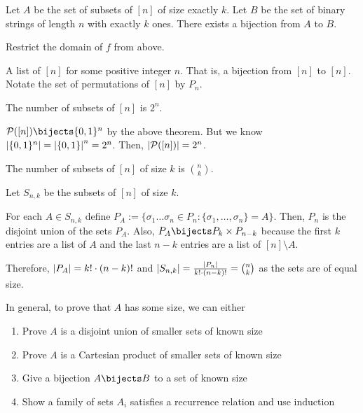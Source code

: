\documentclass[class=math239,notes]{agony}
\begin{document}
\begin{theorem}
  Let $A$ be the set of subsets of $[n]$ of size exactly $k$.
  Let $B$ be the set of binary strings of length $n$ with exactly $k$ ones.
  There exists a bijection from $A$ to $B$.
\end{theorem}
\begin{prf}
  Restrict the domain of $f$ from above.
\end{prf}

\begin{defn}[permutation]
  A list of $[n]$ for some positive integer $n$.
  That is, a bijection from $[n]$ to $[n]$.
  Notate the set of permutations of $[n]$ by $P_n$.
\end{defn}

\begin{theorem}[1.3]
  The number of subsets of $[n]$ is $2^n$.
\end{theorem}
\begin{prf}
  $\mathcal{P}([n]) \bijects \{0,1\}^n$ by the above theorem.
  But we know $\abs{\{0,1\}^n} = \abs{\{0,1\}}^n = 2^n$.
  Then, $\abs{\mathcal{P}([n])} = 2^n$.
\end{prf}

\begin{theorem}[1.5]
  The number of subsets of $[n]$ of size $k$ is $\binom{n}{k}$.
\end{theorem}
\begin{prf}
  Let $S_{n,k}$ be the subsets of $[n]$ of size $k$.

  For each $A \in S_{n,k}$ define $P_A := \{\sigma_1\dots\sigma_n \in P_n : \{\sigma_1,\dotsc,\sigma_n\} = A\}$.
  Then, $P_n$ is the disjoint union of the sets $P_A$.
  Also, $P_A \bijects P_k \times P_{n-k}$ because the first $k$ entries are a list of $A$
  and the last $n-k$ entries are a list of $[n] \setminus A$.

  Therefore, $\abs{P_A} = k! \cdot (n-k)!$ and
  $\abs{S_{n,k}} = \frac{\abs{P_n}}{k!\cdot(n-k)!} = \binom{n}{k}$
  as the sets are of equal size.
\end{prf}

In general, to prove that $A$ has some size, we can either
\begin{enumerate}[(1),nosep]
  \item Prove $A$ is a disjoint union of smaller sets of known size
  \item Prove $A$ is a Cartesian product of smaller sets of known size
  \item Give a bijection $A \bijects B$ to a set of known size
  \item Show a family of sets $A_i$ satisfies a recurrence relation and use induction
\end{enumerate}
\end{document}
